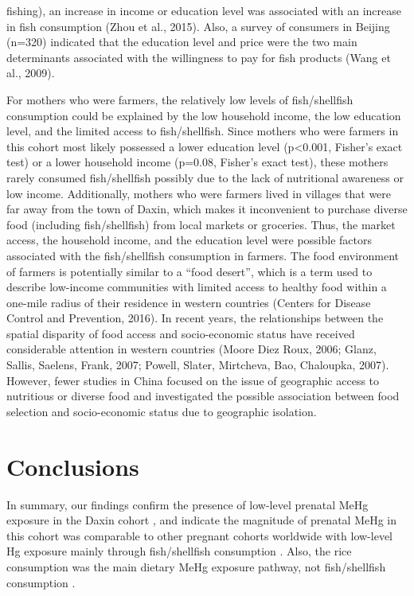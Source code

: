 fishing), an increase in income or education level was associated with an increase in fish consumption (Zhou et al., 2015). Also, a survey of consumers in Beijing (n=320) indicated that the education level and price were the two main determinants associated with the willingness to pay for fish products (Wang et al., 2009).

For mothers who were farmers, the relatively low levels of fish/shellfish consumption could be explained by the low household income, the low education level, and the limited access to fish/shellfish. Since mothers who were farmers in this cohort most likely possessed a lower education level (p<0.001, Fisher's exact test) or a lower household income (p=0.08, Fisher's exact test), these mothers rarely consumed fish/shellfish possibly due to the lack of nutritional awareness or low income. Additionally, mothers who were farmers lived in villages that were far away from the town of Daxin, which makes it inconvenient to purchase diverse food (including fish/shellfish) from local markets or groceries. Thus, the market access, the household income, and the education level were possible factors associated with the fish/shellfish consumption in farmers. The food environment of farmers is potentially similar to a ``food desert'', which is a term used to describe low-income communities with limited access to healthy food within a one-mile radius of their residence in western countries (Centers for Disease Control and Prevention, 2016). In recent years, the relationships between the spatial disparity of food access and socio-economic status have received considerable attention in western countries (Moore  Diez Roux, 2006; Glanz, Sallis, Saelens,  Frank, 2007; Powell, Slater, Mirtcheva, Bao,  Chaloupka, 2007). However, fewer studies in China focused on the issue of geographic access to nutritious or diverse food and investigated the possible association between food selection and socio-economic status due to geographic isolation.

\section{Conclusions}

In summary, our findings confirm the presence of low-level prenatal MeHg exposure in the Daxin cohort \cite{karagas2012evidence}, and indicate the magnitude of prenatal MeHg in this cohort was comparable to other pregnant cohorts worldwide with low-level Hg exposure mainly through fish/shellfish consumption \cite{kershaw1980relationship}. Also, the rice consumption was the main dietary MeHg exposure pathway, not fish/shellfish consumption \cite{allen2006guidelines}.



